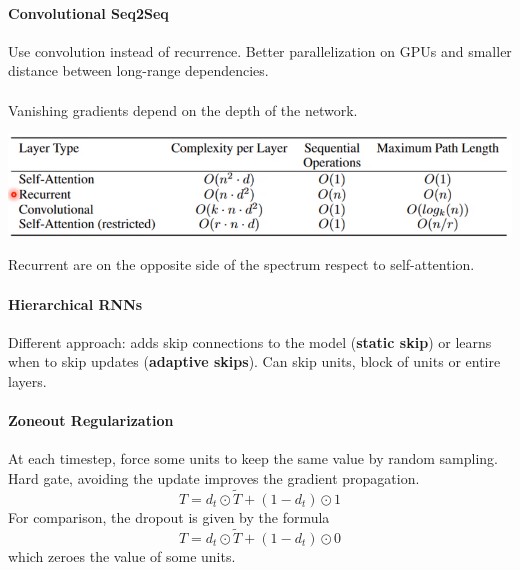 \documentclass[10pt]{report}
\begin{document}
\paragraph{Convolutional Seq2Seq} Use convolution instead of recurrence. Better parallelization on GPUs and smaller distance between long-range dependencies.\\\\
Vanishing gradients depend on the depth of the network.
\begin{center}
	\includegraphics[scale=0.5]{121.png}
\end{center}
Recurrent are on the opposite side of the spectrum respect to self-attention.
\paragraph{Hierarchical RNNs} Different approach: adds skip connections to the model (\textbf{static skip}) or learns when to skip updates (\textbf{adaptive skips}). Can skip units, block of units or entire layers.
\paragraph{Zoneout Regularization} At each timestep, force some units to keep the same value by random sampling. Hard gate, avoiding the update improves the gradient propagation.
$$T = d_t\odot \tilde{T}+(1-d_t)\odot 1$$
For comparison, the dropout is given by the formula
$$T = d_t\odot\tilde{T}+(1-d_t)\odot 0$$
which zeroes the value of some units.
\end{document}
